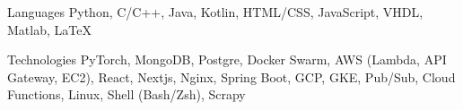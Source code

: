 

\begin{cvskills}

  \cvskill
    {Languages} %
    {Python, C/C++, Java, Kotlin, HTML/CSS, JavaScript, VHDL, Matlab, LaTeX} %

  \cvskill
    {Technologies} %
    {PyTorch, MongoDB, Postgre, Docker Swarm, AWS (Lambda, API Gateway, EC2), React, Nextjs, Nginx, Spring Boot, GCP, GKE, Pub/Sub, Cloud Functions, Linux, Shell (Bash/Zsh), Scrapy}





\end{cvskills}



